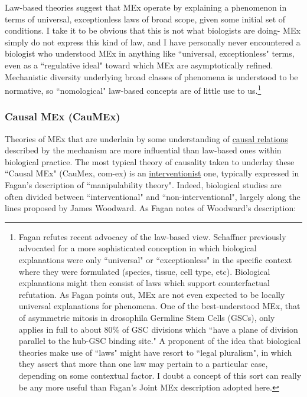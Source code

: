 Law-based theories suggest that MEx operate by explaining a phenomenon in terms of universal, exceptionless laws of broad scope, given some initial set of conditions. I take it to be obvious that this is not what biologists are doing- MEx simply do not express this kind of law, and I have personally never encountered a biologist who understood MEx in anything like ``universal, exceptionless" terms, even as a ``regulative ideal" toward which MEx are asymptotically refined. Mechanistic diversity underlying broad classes of phenomena is understood to be normative, so ``nomological" law-based concepts are of little use to us.\footnote{Fagan refutes recent advocacy of the law-based view. Schaffner previously advocated for a more sophisticated conception in which biological explanations were only ``universal" or ``exceptionless" in the specific context where they were formulated (species, tissue, cell type, etc). Biological explanations might then consist of laws which support counterfactual refutation. As Fagan points out, MEx are not even expected to be locally universal explanations for phenomena. One of the best-understood MEx, that of asymmetric mitosis in drosophila Germline Stem Cells (GSCs), only applies in full to about 80\% of GSC divisions which ``have a plane of division parallel to the hub-GSC binding site."
\cite[p.97]{Fagan2013}
A proponent of the idea that biological theories make use of ``laws" might have resort to ``legal pluralism", in which they assert that more than one law may pertain to a particular case, depending on some contextual factor. I doubt a concept of this sort can really be any more useful than Fagan's Joint MEx description adopted here.
}

\subsubsection{Causal MEx (CauMEx)}
Theories of MEx that are underlain by some understanding of \hyperref[causality]{causal relations} described by the mechanism are more influential than law-based ones within biological practice. The most typical theory of causality taken to underlay these ``Causal MEx" (CauMex, com-ex) is an \hyperref[causality]{interventionist} one, typically expressed in Fagan's description of ``manipulability theory". Indeed, biological studies are often divided between ``interventional" and ``non-interventional", largely along the lines proposed by James Woodward. As Fagan notes of Woodward's description:

